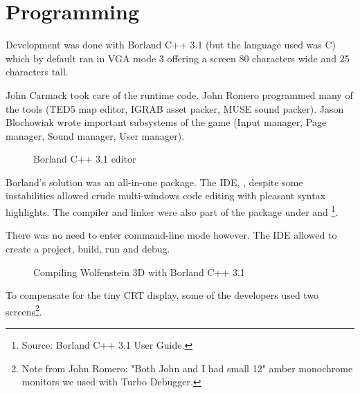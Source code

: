 \documentclass[book.tex]{subfiles}
\begin{document}
\section{Programming}



Development was done with Borland C++ 3.1 (but the language used was C) which by default ran in VGA mode 3 offering a screen 80 characters wide and 25 characters tall.\\
\par
John Carmack took care of the runtime code. John Romero programmed many of the tools (TED5 map editor, IGRAB asset packer, MUSE sound packer). Jason Blochowiak wrote important subsystems of the game (Input manager, Page manager, Sound manager, User manager).\\

\begin{figure}[H]
\centering
\caption{Borland C++ 3.1 editor}
\end{figure}
\par
Borland's solution was an all-in-one package. The IDE, , despite some instabilities allowed crude multi-windows code editing with pleasant syntax highlights. The compiler and linker were also part of the package under  and \footnote{Source: Borland C++ 3.1 User Guide.}.
\pagebreak


There was no need to enter command-line mode however. The IDE allowed to create a project, build, run and debug.\\
\par
\begin{figure}[H]
\centering
  \caption{Compiling Wolfenstein 3D with Borland C++ 3.1}
\end{figure}





To compensate for the tiny CRT display, some of the developers used two screens\footnote{Note from John Romero: "Both John and I had small 12" amber monochrome monitors we used with Turbo Debugger.}.\\
\end{document}
